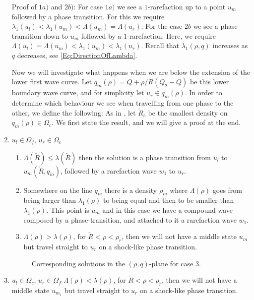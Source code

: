 \documentclass[10pt]{article}
\numberwithin{equation}{section}
\begin{document}
\begin{enumerate}
Proof of $1a)$ and $2b)$: \newline
For case $1a)$ we see a $1$-rarefaction up to a point $u_m$ followed by a phase transition. For this we require $\lambda_1(u_l) < \lambda_1(u_m) < \Lambda(u_m) = \Lambda(u_r)$. For the case $2b$ we see a phase transition down to $u_m$ followed by a $1$-rarefaction.  Here, we require $\Lambda(u_l) = \Lambda(u_m) < \lambda_1(u_m) < \lambda_1(u_r)$. Recall that $\lambda_1(\rho,q)$ increases as $q$ decreases, see \ref{Eq:DirectionOfLambda}.  


Now we will investigate what happens when we are below the extension of the lower first wave curve. Let $q_m(\rho) = Q + \rho/R(Q_2 - Q)$ be this lower boundary wave curve, and for simplicity let $u_r \in q_m(\rho)$.
In order to determine which behaviour we see when travelling from one phase to the other, we define the following: As in \cite{Colombo2002}, let $\check R_c$ be the smallest density on $q_m(\rho) \in \Omega_c$. We first state the result, and we will give a proof at the end. 

\item $u_l \in \Omega_f$, $u_r \in \Omega_c$ 
    \begin{enumerate}
    \item $\Lambda(\check R) \leq \lambda(\check R)$ then the solution is a phase transition from $u_l$ to $u_{m}(\check R, q_m)$, followed by a rarefaction wave $w_1$ to $u_r$. 
    \item Somewhere on the line $q_m$ there is a density $\rho_m$ where $\Lambda(\rho)$ goes from being larger than $\lambda_1(\rho)$ to being equal and then to be smaller than $\lambda_1(\rho)$. This point is $u_{m}$ and in this case we have a compound wave composed by a phase-transition, and attached to it a rarefaction wave $w_1$. 
    \item $ \Lambda( \rho) > \lambda(\rho)$, for $\check R < \rho < \rho_r$, then we will not have a middle state $u_{m}$ but travel straight to $u_r$ on a shock-like phase transition.
    \end{enumerate}
\begin{figure}[H]
    \centering
    
    \caption{Corresponding solutions in the $(\rho, q)$-plane for case $3.$}
    \label{fig:PhTComplexCase1}
\end{figure}
 
\item $u_l \in \Omega_c$, $u_r \in \Omega_f$ \newline
     $ \Lambda( \rho) < \lambda(\rho)$, for $\check R < \rho < \rho_r$, then we will not have a middle state $u_{m_1}$ but travel straight to $u_r$ on a shock-like phase transition.
\end{enumerate}
\end{document}
